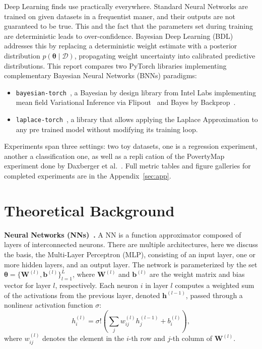\documentclass[conference]{IEEEtran}
\newcommand{\btheta}{\bm{\theta}}
\newcommand{\cD}{\mathcal{D}}
\begin{document}
Deep Learning finds use practically everywhere. Standard Neural Networks are
trained on given datasets in a frequentist maner, and their outputs are not
guaranteed to be true. This and the fact that the parameters set during training
are deterministic leads to over-confidence. Bayesian Deep Learning (BDL) addresses this
by replacing a deterministic weight estimate with a posterior distribution
$p(\btheta \mid \cD)$, propagating weight uncertainty into calibrated predictive distributions.
This report compares two PyTorch libraries implementing complementary Bayesian Neural Networks (BNNs) paradigms:
\begin{itemize}[leftmargin=*]
	\item \texttt{bayesian-torch}~\citep{intel2021bayesiantorch}, a
	      Bayesian by design library from Intel Labs implementing mean field
	      Variational Inference via Flipout~\citep{wen2018flipout} and
	      Bayes by Backprop~\citep{blundell2015weight}.
	\item \texttt{laplace-torch}~\citep{daxberger2021laplace,aleximmer2024laplace},
	      a library that allows applying the Laplace Approximation to any
	      pre trained model without modifying its training loop.
\end{itemize}

Experiments span three settings: two toy datasets, one is a regression
experiment, another a classification one, as well as a repli cation of the PovertyMap experiment done by Daxberger et al.~\citep{daxberger2021laplace}.
Full metric tables and figure galleries for completed experiments are in the Appendix~\ref{sec:app}.

\section{Theoretical Background}
\label{sec:theory}

\textbf{Neural Networks (NNs)~\citep{goan2020bayesian}.} A NN is a function approximator composed of layers of
interconnected neurons. There are multiple architectures, here we discuss the basis, the Multi-Layer
Perceptron (MLP), consisting of an input layer, one or more hidden layers, and
an output layer. The network is parameterized by the set $\btheta = \{\mathbf{W}^{(l)}, \mathbf{b}^{(l)}\}_{l=1}^{L}$,
where $\mathbf{W}^{(l)}$ and $\mathbf{b}^{(l)}$ are the weight matrix and bias vector for layer $l$, respectively.
Each neuron $i$ in layer $l$ computes a weighted sum of the activations from the previous layer, denoted
$\mathbf{h}^{(l-1)}$, passed through a nonlinear activation function $\sigma$:\begin{equation}h_i^{(l)} =
	\sigma!\left(\sum_j w_{ij}^{(l)} h_j^{(l-1)} + b_i^{(l)}\right),\end{equation}where $w_{ij}^{(l)}$ denotes the element
in the $i$-th row and $j$-th column of $\mathbf{W}^{(l)}$.
\end{document}
